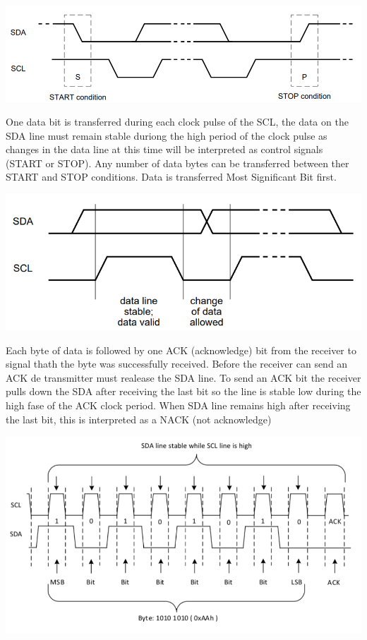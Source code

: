 \documentclass[]{article}
\begin{document}
\begin{center}
    \includegraphics[scale=0.5]{start_stop_conditions}
\end{center}
One data bit is transferred during each clock pulse of the SCL, the data on the SDA line must remain stable duriong the high period of the clock pulse
as changes in the data line at this time will be interpreted as control signals (START or STOP). Any number of data bytes can be transferred between
ther START and STOP conditions. Data is transferred Most Significant Bit first.

\begin{center}
    \includegraphics[scale=0.5]{bit_transfer}
\end{center}
Each byte of data is followed by one ACK (acknowledge) bit from the receiver to signal thath the byte was successfully received. Before the receiver can send an ACK 
de transmitter must realease the SDA line. To send an ACK bit the receiver pulls down the SDA after receiving the last bit so the line is stable low during the high 
fase of the ACK clock period. When SDA line remains high after receiving the last bit, this is interpreted as a NACK (not acknowledge)

\begin{center}
    \includegraphics[scale=0.5]{byte_transmission}
\end{center}
\end{document}
